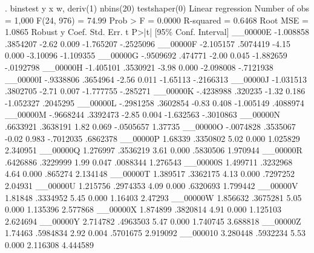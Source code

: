 . binstest y x w, deriv(1) nbins(20) testshaper(0)
{\smallskip}
Linear regression                               Number of obs     =      1,000
                                                F(24, 976)        =      74.99
                                                Prob > F          =     0.0000
                                                R-squared         =     0.6468
                                                Root MSE          =     1.0865
{\smallskip}
             {\VBAR}               Robust
           y {\VBAR}      Coef.   Std. Err.      t    P>|t|     [95\% Conf. Interval]
    __00000E {\VBAR}  -1.008858   .3854207    -2.62   0.009    -1.765207   -.2525096
    __00000F {\VBAR}  -2.105157   .5074419    -4.15   0.000     -3.10096   -1.109355
    __00000G {\VBAR}  -.9509692    .474771    -2.00   0.045    -1.882659   -.0192798
    __00000H {\VBAR}  -1.405101   .3530921    -3.98   0.000    -2.098008   -.7121938
    __00000I {\VBAR}  -.9338806   .3654964    -2.56   0.011     -1.65113   -.2166313
    __00000J {\VBAR}  -1.031513   .3802705    -2.71   0.007    -1.777755    -.285271
    __00000K {\VBAR}  -.4238988    .320235    -1.32   0.186    -1.052327    .2045295
    __00000L {\VBAR}  -.2981258   .3602854    -0.83   0.408    -1.005149    .4088974
    __00000M {\VBAR}  -.9668244   .3392473    -2.85   0.004    -1.632563   -.3010863
    __00000N {\VBAR}   .6633921   .3638191     1.82   0.069    -.0505657     1.37735
    __00000O {\VBAR}  -.0074828   .3535067    -0.02   0.983    -.7012035    .6862378
    __00000P {\VBAR}    1.68339   .3350802     5.02   0.000     1.025829    2.340951
    __00000Q {\VBAR}   1.276997   .3536219     3.61   0.000     .5830506    1.970944
    __00000R {\VBAR}   .6426886   .3229999     1.99   0.047     .0088344    1.276543
    __00000S {\VBAR}   1.499711   .3232968     4.64   0.000      .865274    2.134148
    __00000T {\VBAR}   1.389517   .3362175     4.13   0.000     .7297252     2.04931
    __00000U {\VBAR}   1.215756   .2974353     4.09   0.000     .6320693    1.799442
    __00000V {\VBAR}    1.81848   .3334952     5.45   0.000      1.16403     2.47293
    __00000W {\VBAR}   1.856632   .3675281     5.05   0.000     1.135396    2.577868
    __00000X {\VBAR}   1.874899   .3820814     4.91   0.000     1.125103    2.624694
    __00000Y {\VBAR}   2.714782   .4963503     5.47   0.000     1.740745    3.688818
    __00000Z {\VBAR}    1.74463   .5984834     2.92   0.004     .5701675    2.919092
    __000010 {\VBAR}   3.280448   .5932234     5.53   0.000     2.116308    4.444589
